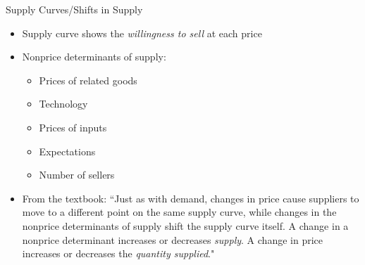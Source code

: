\documentclass{beamer}
\begin{document}
\begin{frame}{Supply Curves/Shifts in Supply}
    \begin{itemize}
        \item Supply curve shows the \textit{willingness to sell} at each price
        \item Nonprice determinants of supply:
        \begin{itemize}
            \item Prices of related goods
            \item Technology
            \item Prices of inputs
            \item Expectations
            \item Number of sellers
        \end{itemize}
        \item From the textbook: ``Just as with demand, changes in price cause suppliers to move to a different point on the same supply curve, while changes in the nonprice determinants of supply shift the supply curve itself. A change in a nonprice determinant increases or decreases \textit{supply}. A change in price increases or decreases the \textit{quantity supplied}."
    \end{itemize}
\end{frame}
\end{document}
